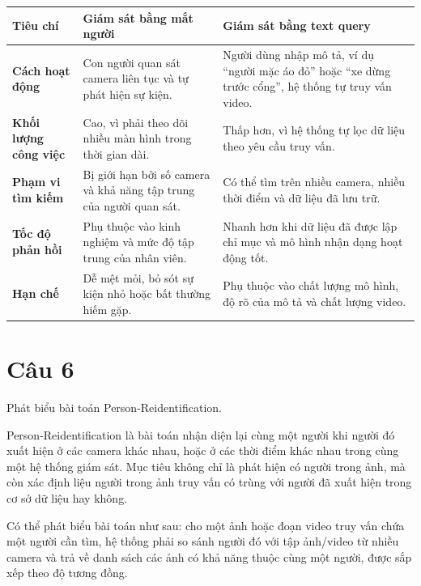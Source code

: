\small
\begin{longtable}{|p{}|p{}|p{}|}
\hline
\textbf{Tiêu chí} & \textbf{Giám sát bằng mắt người} & \textbf{Giám sát bằng text query} \\
\hline
\textbf{Cách hoạt động} & Con người quan sát camera liên tục và tự phát hiện sự kiện. & Người dùng nhập mô tả, ví dụ ``người mặc áo đỏ'' hoặc ``xe dừng trước cổng'', hệ thống tự truy vấn video. \\
\hline
\textbf{Khối lượng công việc} & Cao, vì phải theo dõi nhiều màn hình trong thời gian dài. & Thấp hơn, vì hệ thống tự lọc dữ liệu theo yêu cầu truy vấn. \\
\hline
\textbf{Phạm vi tìm kiếm} & Bị giới hạn bởi số camera và khả năng tập trung của người quan sát. & Có thể tìm trên nhiều camera, nhiều thời điểm và dữ liệu đã lưu trữ. \\
\hline
\textbf{Tốc độ phản hồi} & Phụ thuộc vào kinh nghiệm và mức độ tập trung của nhân viên. & Nhanh hơn khi dữ liệu đã được lập chỉ mục và mô hình nhận dạng hoạt động tốt. \\
\hline
\textbf{Hạn chế} & Dễ mệt mỏi, bỏ sót sự kiện nhỏ hoặc bất thường hiếm gặp. & Phụ thuộc vào chất lượng mô hình, độ rõ của mô tả và chất lượng video. \\
\hline
\end{longtable}
\normalsize


\section*{Câu 6}
Phát biểu bài toán Person-Reidentification.

Person-Reidentification là bài toán nhận diện lại cùng một người khi người đó xuất hiện ở các camera khác nhau, hoặc ở các thời điểm khác nhau trong cùng một hệ thống giám sát. Mục tiêu không chỉ là phát hiện có người trong ảnh, mà còn xác định liệu người trong ảnh truy vấn có trùng với người đã xuất hiện trong cơ sở dữ liệu hay không.

Có thể phát biểu bài toán như sau: cho một ảnh hoặc đoạn video truy vấn chứa một người cần tìm, hệ thống phải so sánh người đó với tập ảnh/video từ nhiều camera và trả về danh sách các ảnh có khả năng thuộc cùng một người, được sắp xếp theo độ tương đồng.

